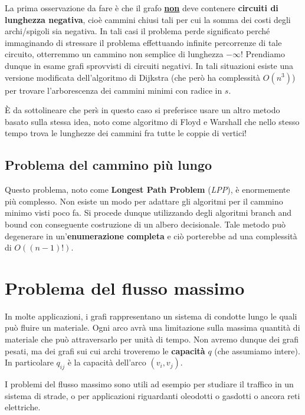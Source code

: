 \documentclass[11pt]{book}
\begin{document}
La prima osservazione da fare \`e che il grafo {\underline {\bf non}}
deve contenere {\bf circuiti di lunghezza negativa}, cio\`e cammini
chiusi tali per cui la somma dei costi degli archi/spigoli sia
negativa. In tali casi il problema perde significato perch\'e
immaginando di stressare il problema effettuando infinite percorrenze
di tale circuito, otterremmo un cammino non semplice di lunghezza
$-\infty$! Prendiamo dunque in esame grafi sprovvisti di circuiti
negativi. In tali situazioni esiste una versione modificata
dell'algoritmo di Dijkstra (che per\`o ha complessit\`a $O(n^3)$) per
trovare l'arborescenza dei cammini minimi con radice in $s$.


\`E da sottolineare che per\`s in questo caso si preferisce usare un
altro metodo basato sulla stessa idea, noto come algoritmo di Floyd e
Warshall che nello stesso tempo trova le lunghezze dei cammini fra
tutte le coppie di vertici!


\subsection{Problema del cammino pi\`u lungo}


Questo problema, noto come {\bf Longest Path Problem} ({\em LPP}), \`e
enormemente pi\`u complesso. Non esiste un modo per adattare gli
algoritmi per il cammino minimo visti poco fa. Si procede dunque
utilizzando degli algoritmi branch and bound con conseguente
costruzione di un albero decisionale. Tale metodo pu\`o degenerare in
un'{\bf enumerazione completa} e ci\`o porterebbe ad una complessit\`a
di $O((n-1)!)$.




\section{Problema del flusso massimo}


In molte applicazioni, i grafi rappresentano un sistema di condotte
lungo le quali pu\`o fluire un materiale. Ogni arco avr\`a una
limitazione sulla massima quantit\`a di materiale che pu\`o
attraversarlo per unit\`a di tempo. Non avremo dunque dei grafi
pesati, ma dei grafi sui cui archi troveremo le {\bf capacit\`a} $q$
(che assumiamo intere). In particolare $q_{ij}$ \`e la capacit\`a
dell'arco $(v_i, v_j)$.


I problemi del flusso massimo sono utili ad esempio per studiare il
traffico in un sistema di strade, o per applicazioni riguardanti
oleodotti o gasdotti o ancora reti elettriche.
\end{document}
